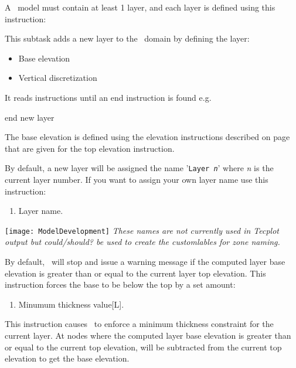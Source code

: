 A \mfus\ model must contain at least 1 layer, and each layer is defined using this instruction:     {

    {This subtask adds a new layer to the \gwf\ domain by defining the layer:
     \begin{itemize}
       \item Base elevation
       \item Vertical discretization
     \end{itemize}

     It reads instructions until an \textsf{end} instruction is found e.g.\:

    {\Large \sf end new layer}
    }

The base elevation is defined using the elevation instructions  described on page~\pageref{'Page:TopElev'} that are given for the \textsf{top elevation} instruction.

By default, a new layer will be assigned the name '\texttt{Layer {\em n}}' where {\em n} is the current layer number.  If you want to assign your own layer name use this instruction:

    {
    \squish
    \begin{enumerate}
    \item {} Layer name.
    \end{enumerate}
    \squish
    }

\texttt{[image: ModelDevelopment]} \textit{These names are not currently used in Tecplot output but could/should? be used to create the customlables for zone naming.}



By default, \mut\ will stop and issue a warning message if the computed layer base elevation is greater than or equal to the current layer top elevation.  This instruction forces the base to be below the top by a set amount:

    {\squish
    \begin{enumerate}
    \item {} Minumum thickness value[L].
    \end{enumerate}
    This instruction causes \mut\ to enforce a minimum thickness constraint for the current layer. At nodes where the computed layer base elevation is greater than or equal to the current top elevation,  will
    be subtracted from the current top elevation to get the base elevation.
    }

}
